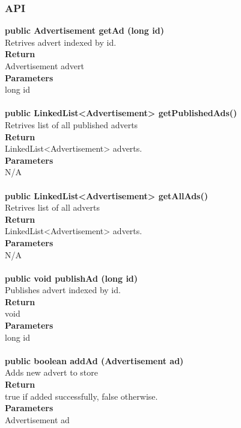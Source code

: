 \documentclass{l3deliverable}
\begin{document}
\subsubsection{API}
\textbf{public Advertisement getAd (long id)}\\
Retrives advert indexed by id.\\
\textbf{Return}\\
Advertisement advert\\
\textbf{Parameters}\\
long id\\
\\

\textbf{public LinkedList<Advertisement> getPublishedAds()}\\
Retrives list of all published adverts\\
\textbf{Return}\\
LinkedList<Advertisement> adverts.\\
\textbf{Parameters}\\
N/A\\
\\

\textbf{public LinkedList<Advertisement> getAllAds()}\\
Retrives list of all adverts\\
\textbf{Return}\\
LinkedList<Advertisement> adverts.\\
\textbf{Parameters}\\
N/A\\
\\

\textbf{public void publishAd (long id)}\\
Publishes advert indexed by id.\\
\textbf{Return}\\
void\\
\textbf{Parameters}\\
long id\\
\\

\textbf{public boolean addAd (Advertisement ad)}\\
Adds new advert to store\\
\textbf{Return}\\
true if added successfully, false otherwise.\\
\textbf{Parameters}\\
Advertisement ad\\
\\
\end{document}
